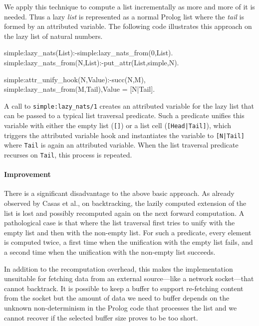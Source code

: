 \documentclass[submission,copyright,creativecommons]{eptcs}
\begin{document}
We apply this technique to compute a list incrementally as more
and more of it is needed. Thus a lazy \emph{list} is represented as a normal
Prolog list where the \emph{tail} is formed by an attributed variable. The following
code illustrates this approach on the lazy list of natural numbers.
\begin{code}
simple:lazy_nats(List):-simple:lazy_nats_from(0,List). 
simple:lazy_nats_from(N,List):-put_attr(List,simple,N).

simple:attr_unify_hook(N,Value):-succ(N,M),
  simple:lazy_nats_from(M,Tail),Value = [N|Tail].
\end{code}
A call to \texttt{simple:lazy\_nats/1} creates an attributed variable for the lazy list
that can be passed to a typical list traversal predicate.  Such a predicate
unifies this variable with either the empty list (\texttt{[]}) or a list cell
(\texttt{[Head|Tail]}), which triggers the attributed variable hook and
instantiates the variable to {\tt [N|Tail]} where {\tt Tail} is again an
attributed variable. When the list traversal predicate recurses on {\tt Tail},
this process is repeated.

\paragraph{Improvement}
There is a significant disadvantage to the above basic approach.  As already
observed by Casas et al., on backtracking, the lazily computed extension of the
list is lost and possibly recomputed again on the next forward computation. A
pathological case is that where the list traversal first tries to unify with
the empty list and then with the non-empty list. For such a predicate, every
element is computed twice, a first time when the unification with the empty
list fails, and a second time when the unification with the non-empty list
succeeds.

In addition to the recomputation overhead, this makes the implementation
unsuitable for fetching data from an external source---like a network socket---that cannot backtrack. It is possible to keep a
buffer to support re-fetching content from the socket but the amount of data we
need to buffer depends on the unknown non-determinism in the Prolog code that
processes the list and we cannot recover if the selected buffer size proves to
be too short.
\end{document}
